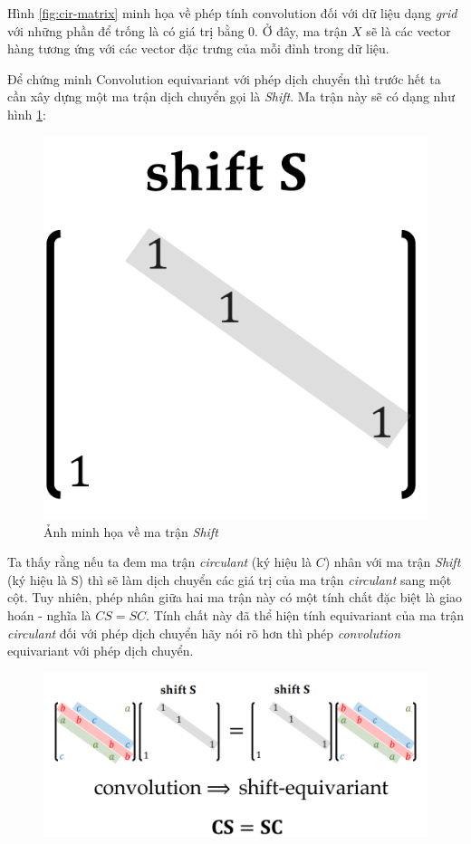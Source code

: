 Hình \ref{fig:cir-matrix} minh họa về phép tính convolution đối với dữ liệu dạng \textit{grid} với những phần để trống là có giá trị bằng 0. Ở đây, ma trận $X$ sẽ là các vector hàng tương ứng với các vector đặc trưng của mỗi đỉnh trong dữ liệu. 

Để chứng minh Convolution equivariant với phép dịch chuyển thì trước hết ta cần xây dựng một ma trận dịch chuyển gọi là \textit{Shift}. Ma trận này sẽ có dạng như hình \ref{fig:shift-matrix}:

\begin{figure}[H]
    \centering
    \includegraphics[width=0.4\linewidth]{Images/GDL/grid_conv/shift_matrix.png}
    \caption{Ảnh minh họa về ma trận \textit{Shift}\cite{geometricdeep2022}}
    \label{fig:shift-matrix}
\end{figure}

Ta thấy rằng nếu ta đem ma trận \textit{circulant} (ký hiệu là $C$) nhân với ma trận \textit{Shift} (ký hiệu là S) thì sẽ làm dịch chuyển các giá trị của ma trận \textit{circulant} sang một cột. Tuy nhiên, phép nhân giữa hai ma trận này có một tính chất đặc biệt là giao hoán - nghĩa là $CS = SC$. Tính chất này đã thể hiện tính equivariant của ma trận \textit{circulant} đối với phép dịch chuyển hãy nói rõ hơn thì phép \textit{convolution} equivariant với phép dịch chuyển.

\begin{figure}[H]
    \centering
    \includegraphics[width=1\linewidth]{Images/GDL/grid_conv/CSSC.png}
\end{figure}

